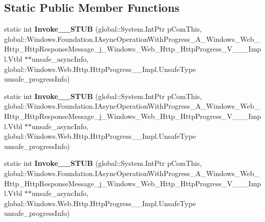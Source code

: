 \subsection*{Static Public Member Functions}
\begin{DoxyCompactItemize}
\item 
\mbox{\label{struct_windows_1_1_foundation_1_1_async_operation_progress_handler___a___windows___web___http___de22f4531f01508213e1f7c66531e51a_a6095e7ac8c16941080df1826a7e53895}} 
static int {\bfseries Invoke\+\_\+\+\_\+\+S\+T\+UB} (global\+::\+System.\+Int\+Ptr p\+Com\+This, global\+::\+Windows.\+Foundation.\+I\+Async\+Operation\+With\+Progress\+\_\+\+A\+\_\+\+Windows\+\_\+\+Web\+\_\+\+Http\+\_\+\+Http\+Response\+Message\+\_\+j\+\_\+\+Windows\+\_\+\+Web\+\_\+\+Http\+\_\+\+Http\+Progress\+\_\+\+V\+\_\+\+\_\+\+\_\+\+Impl.\+Vtbl $\ast$$\ast$unsafe\+\_\+async\+Info, global\+::\+Windows.\+Web.\+Http.\+Http\+Progress\+\_\+\+\_\+\+Impl.\+Unsafe\+Type unsafe\+\_\+progress\+Info)
\item 
\mbox{\label{struct_windows_1_1_foundation_1_1_async_operation_progress_handler___a___windows___web___http___de22f4531f01508213e1f7c66531e51a_a6095e7ac8c16941080df1826a7e53895}} 
static int {\bfseries Invoke\+\_\+\+\_\+\+S\+T\+UB} (global\+::\+System.\+Int\+Ptr p\+Com\+This, global\+::\+Windows.\+Foundation.\+I\+Async\+Operation\+With\+Progress\+\_\+\+A\+\_\+\+Windows\+\_\+\+Web\+\_\+\+Http\+\_\+\+Http\+Response\+Message\+\_\+j\+\_\+\+Windows\+\_\+\+Web\+\_\+\+Http\+\_\+\+Http\+Progress\+\_\+\+V\+\_\+\+\_\+\+\_\+\+Impl.\+Vtbl $\ast$$\ast$unsafe\+\_\+async\+Info, global\+::\+Windows.\+Web.\+Http.\+Http\+Progress\+\_\+\+\_\+\+Impl.\+Unsafe\+Type unsafe\+\_\+progress\+Info)
\item 
\mbox{\label{struct_windows_1_1_foundation_1_1_async_operation_progress_handler___a___windows___web___http___de22f4531f01508213e1f7c66531e51a_a6095e7ac8c16941080df1826a7e53895}} 
static int {\bfseries Invoke\+\_\+\+\_\+\+S\+T\+UB} (global\+::\+System.\+Int\+Ptr p\+Com\+This, global\+::\+Windows.\+Foundation.\+I\+Async\+Operation\+With\+Progress\+\_\+\+A\+\_\+\+Windows\+\_\+\+Web\+\_\+\+Http\+\_\+\+Http\+Response\+Message\+\_\+j\+\_\+\+Windows\+\_\+\+Web\+\_\+\+Http\+\_\+\+Http\+Progress\+\_\+\+V\+\_\+\+\_\+\+\_\+\+Impl.\+Vtbl $\ast$$\ast$unsafe\+\_\+async\+Info, global\+::\+Windows.\+Web.\+Http.\+Http\+Progress\+\_\+\+\_\+\+Impl.\+Unsafe\+Type unsafe\+\_\+progress\+Info)
$$
\end{DoxyCompactItemize}
